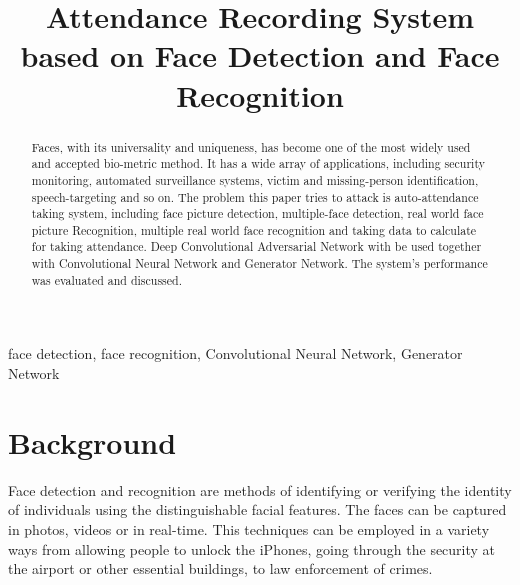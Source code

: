 \documentclass[conference]{IEEEtran}
\begin{document}
\title{Attendance Recording System based on Face Detection and Face Recognition}

\author{
\and

\and
{}
}

\maketitle

\begin{abstract}
Faces, with its universality and uniqueness, has become one of the most widely used and accepted bio-metric method. It has a wide array of applications, including security monitoring, automated surveillance systems, victim and missing-person identification, speech-targeting and so on. The problem this paper tries to attack is auto-attendance taking system, including face picture detection, multiple-face detection, real world face picture Recognition, multiple real world face recognition and taking data to calculate for taking attendance. Deep Convolutional Adversarial Network with be used together with Convolutional Neural Network and Generator Network. The system's performance was evaluated and discussed. 
\end{abstract}

\begin{IEEEkeywords}
face detection, face recognition, Convolutional Neural Network, Generator Network
\end{IEEEkeywords}


\section{Background}
Face detection and recognition are methods of identifying or verifying the identity of individuals using the distinguishable facial features. The faces can be captured in photos, videos or in real-time. This techniques can be employed in a variety ways from allowing people to unlock the iPhones, going through the security  at the airport or other essential buildings, to law enforcement of crimes.
\end{document}
